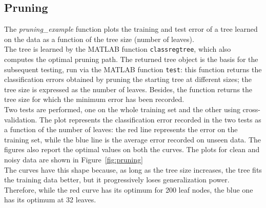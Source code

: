 \documentclass{article}
\begin{document}
\subsection{Pruning}
The \emph{pruning\_example} function plots the training and test error of a tree learned on the data as a function of the tree size (number of leaves).\\
The tree is learned by the MATLAB function \verb$classregtree$, which also computes the optimal pruning path. The returned tree object is the basis for the subsequent testing, run via the MATLAB function \verb$test$: this function returns the classification errors obtained by pruning the starting tree at different sizes; the tree size is expressed as the number of leaves. Besides, the function returns the tree size for which the minimum error has been recorded.\\
Two tests are performed, one on the whole training set and the other using cross-validation. 
The plot represents the classification error recorded in the two tests as a function of the number of leaves: the red line represents the error on the training set, while the blue line is the average error recorded on unseen data. The figures also report the optimal values on both the curves. The plots for clean and noisy data are shown in Figure~\ref{fig:pruning}\\
The curves have this shape because, as long as the tree size increases, the tree fits the training data better, but it progressively loses generalization power. Therefore, while the red curve has its optimum for 200 leaf nodes, the blue one has its optimum at 32 leaves.
\end{document}
